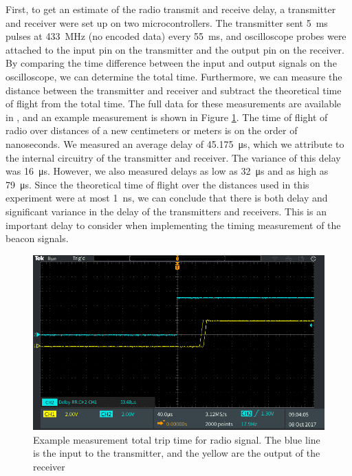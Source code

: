 \documentclass{article}
\newcommand{\Newnameref}[1]{\textit{\nameref{#1}}}
\begin{document}
    First, to get an estimate of the radio transmit and receive delay, a transmitter and receiver were set up on two microcontrollers. The transmitter sent \SI{5}{\milli\second} pulses at \SI{433}{\mega\hertz} (no encoded data) every \SI{55}{\milli\second}, and oscilloscope probes were attached to the input pin on the transmitter and the output pin on the receiver. By comparing the time difference between the input and output signals on the oscilloscope, we can determine the total time. Furthermore, we can measure the distance between the transmitter and receiver and subtract the theoretical time of flight from the total time. The full data for these measurements are available in \Newnameref{appendix:rf-rx-tx}, and an example measurement is shown in Figure \ref{fig:rf_delay_ex}. The time of flight of radio over distances of a new centimeters or meters is on the order of nanoseconds. We measured an average delay of \SI{45.175}{\micro\second}, which we attribute to the internal circuitry of the transmitter and receiver. The variance of this delay was \SI{16}{\micro\second}. However, we also measured delays as low as \SI{32}{\micro\second} and as high as \SI{79}{\micro\second}. Since the theoretical time of flight over the distances used in this experiment were at most \SI{1}{\nano\second}, we can conclude that there is both delay and significant variance in the delay of the transmitters and receivers. This is an important delay to consider when implementing the timing measurement of the beacon signals.

    \begin{figure}[H]
      \centering
      \includegraphics[scale=0.2]{./images/rf_delay_ex.PNG}
      \caption{Example measurement total trip time for radio signal. The blue line is the input to the transmitter, and the yellow are the output of the receiver}
      \label{fig:rf_delay_ex}
    \end{figure}
\end{document}
